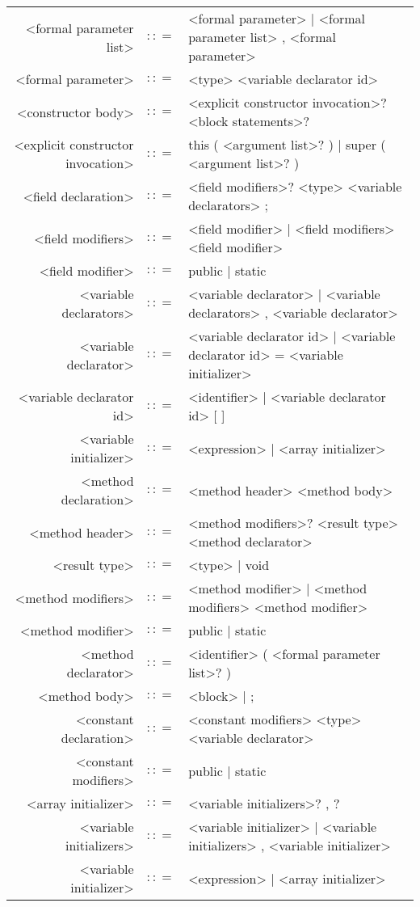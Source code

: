 \documentclass[landscape]{article}
\begin{document}
\begin{center}
\begin{longtable}{r c L{15cm}}
		\\
		<formal parameter list>						&	$\colon\colon=$	&	<formal parameter> | <formal parameter list> , <formal parameter>
		\\
		<formal parameter>							&	$\colon\colon=$	&	<type> <variable declarator id>
		\\
		<constructor body>							&	$\colon\colon=$	&	{ <explicit constructor invocation>? <block statements>? }
		\\
		<explicit constructor invocation>			&	$\colon\colon=$	&	this ( <argument list>? ) | super ( <argument list>? )
		\\
		<field declaration>							&	$\colon\colon=$	&	<field modifiers>? <type> <variable declarators> ;
		\\
		<field modifiers>							&	$\colon\colon=$	&	<field modifier> | <field modifiers> <field modifier>
		\\
		<field modifier>							&	$\colon\colon=$	&	public | static
		\\
		<variable declarators>						&	$\colon\colon=$	&	<variable declarator> | <variable declarators> , <variable declarator>
		\\
		<variable declarator>						&	$\colon\colon=$	&	<variable declarator id> | <variable declarator id> = <variable initializer>
		\\
		<variable declarator id>					&	$\colon\colon=$	&	<identifier> | <variable declarator id> [ ]
		\\
		<variable initializer>						&	$\colon\colon=$	&	<expression> | <array initializer>
		\\
		<method declaration>						&	$\colon\colon=$	&	<method header> <method body>
		\\
		<method header>								&	$\colon\colon=$	&	<method modifiers>? <result type> <method declarator>
		\\
		<result type>								&	$\colon\colon=$	&	<type> | void
		\\
		<method modifiers>							&	$\colon\colon=$	&	<method modifier> | <method modifiers> <method modifier>
		\\
		<method modifier>							&	$\colon\colon=$	&	public | static
		\\
		<method declarator>							&	$\colon\colon=$	&	<identifier> ( <formal parameter list>? )
		\\
		<method body>								&	$\colon\colon=$	&	<block> | ;
		\\
		<constant declaration>						&	$\colon\colon=$	&	<constant modifiers> <type> <variable declarator>
		\\
		<constant modifiers>						&	$\colon\colon=$	&	public | static
		\\
		<array initializer>							&	$\colon\colon=$	&	{ <variable initializers>? , ? }
		\\
		<variable initializers>						&	$\colon\colon=$	&	<variable initializer> | <variable initializers> , <variable initializer>
		\\
		<variable initializer>						&	$\colon\colon=$	&	<expression> | <array initializer>
	\end{longtable}
\end{center}
\end{document}
